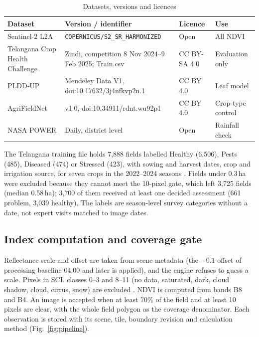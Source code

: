 \documentclass[conference]{IEEEtran}
\begin{document}
\begin{table}[t]
\caption{Datasets, versions and licences}
\label{tab:data}
\centering
\footnotesize
\begin{tabular}{@{}p{1.7cm}p{2.5cm}p{1.0cm}p{1.1cm}@{}}
\toprule
Dataset & Version / identifier & Licence & Use \\
\midrule
Sentinel-2 L2A \cite{r3} & \texttt{COPERNICUS/\allowbreak S2\_SR\_\allowbreak HARMONIZED} & Open & All NDVI \\
Telangana Crop Health Challenge \cite{r26} & Zindi, competition 8 Nov 2024--9 Feb 2025; Train.csv & CC BY-SA 4.0 & Evaluation only \\
PLDD-UP \cite{r20} & Mendeley Data V1, doi:10.17632/\allowbreak 3j4nfkvp2n.1 & CC BY 4.0 & Leaf model \\
AgriFieldNet \cite{r27} & v1.0, doi:10.34911/\allowbreak rdnt.wu92p1 & CC BY 4.0 & Crop-type control \\
NASA POWER \cite{r25} & Daily, district level & Open & Rainfall check \\
\bottomrule
\end{tabular}
\end{table}

The Telangana training file holds 7,888 fields labelled Healthy (6,506), Pests (485), Diseased (474) or Stressed (423), with sowing and harvest dates, crop and irrigation source, for seven crops in the 2022--2024 seasons \cite{r26}. Fields under 0.3\,ha were excluded because they cannot meet the 10-pixel gate, which left 3,725 fields (median 0.58\,ha); 3,700 of them received at least one decided assessment (661 problem, 3,039 healthy). The labels are season-level survey categories without a date, not expert visits matched to image dates.

\subsection{Index computation and coverage gate}
Reflectance scale and offset are taken from scene metadata (the $-0.1$ offset of processing baseline 04.00 and later is applied), and the engine refuses to guess a scale. Pixels in SCL classes 0--3 and 8--11 (no data, saturated, dark, cloud shadow, cloud, cirrus, snow) are excluded \cite{r9}. NDVI is computed from bands B8 and B4. An image is accepted when at least 70\% of the field and at least 10 pixels are clear, with the whole field polygon as the coverage denominator. Each observation is stored with its scene, tile, boundary revision and calculation method (Fig.~\ref{fig:pipeline}).
\end{document}
